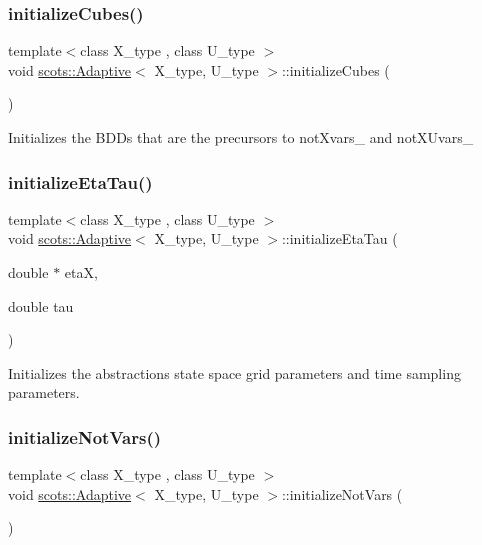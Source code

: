 \subsubsection{\texorpdfstring{initialize\+Cubes()}{initializeCubes()}}
{\footnotesize\ttfamily template$<$class X\+\_\+type , class U\+\_\+type $>$ \\
void \hyperlink{classscots_1_1Adaptive}{scots\+::\+Adaptive}$<$ X\+\_\+type, U\+\_\+type $>$\+::initialize\+Cubes (\begin{DoxyParamCaption}{ }\end{DoxyParamCaption})\hspace{0.3cm}{\ttfamily [inline]}}

Initializes the B\+D\+Ds that are the precursors to not\+Xvars\+\_\+ and not\+X\+Uvars\+\_\+ \mbox{\label{classscots_1_1Adaptive_a3dca1d73761d2678f981512dee5c325d}} 
\subsubsection{\texorpdfstring{initialize\+Eta\+Tau()}{initializeEtaTau()}}
{\footnotesize\ttfamily template$<$class X\+\_\+type , class U\+\_\+type $>$ \\
void \hyperlink{classscots_1_1Adaptive}{scots\+::\+Adaptive}$<$ X\+\_\+type, U\+\_\+type $>$\+::initialize\+Eta\+Tau (\begin{DoxyParamCaption}\item[{double $\ast$}]{etaX,  }\item[{double}]{tau }\end{DoxyParamCaption})\hspace{0.3cm}{\ttfamily [inline]}}

Initializes the abstractions\textquotesingle{} state space grid parameters and time sampling parameters. \mbox{\label{classscots_1_1Adaptive_a6a9af6f25e8c4015ceb24d704da26972}} 
\subsubsection{\texorpdfstring{initialize\+Not\+Vars()}{initializeNotVars()}}
{\footnotesize\ttfamily template$<$class X\+\_\+type , class U\+\_\+type $>$ \\
void \hyperlink{classscots_1_1Adaptive}{scots\+::\+Adaptive}$<$ X\+\_\+type, U\+\_\+type $>$\+::initialize\+Not\+Vars (\begin{DoxyParamCaption}{ }\end{DoxyParamCaption})\hspace{0.3cm}{\ttfamily [inline]}}

